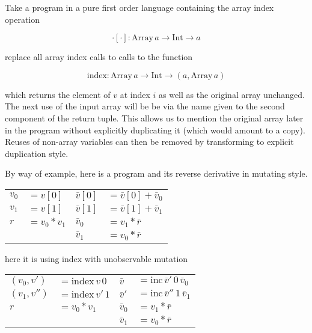 \documentclass[12pt]{article}
\begin{document}
Take a program in a pure first order language containing the array
index operation

\[
\cdot[\cdot] : \mathrm{Array} \, a \to \mathrm{Int} \to a
\]

replace all array index calls to calls to the function

\newcommand{\indexL}{\mathrm{index}}

\[
\indexL : \mathrm{Array} \, a \to \mathrm{Int} \to (a, \mathrm{Array}
\, a)
\]

which returns the element of $v$ at index $i$ as well as the original
array unchanged.  The next use of the input array will be be via the
name given to the second component of the return tuple.  This allows
us to mention the original array later in the program without
explicitly duplicating it (which would amount to a copy).  Reuses of
non-array variables can then be removed by transforming to explicit
duplication style.

By way of example, here is a program and its reverse derivative in
mutating style.

\begin{tabular}[t]{ll|ll}
  $v_0$ & $= v[0]$
  &
  $\bar{v}[0]$ & $ = \bar{v}[0] + \bar{v}_0$
  \\
  
  $v_1$ & $ = v[1]$
  &
  $\bar{v}[1]$ & $ = \bar{v}[1] + \bar{v}_1$
  \\

  $r$ & $= v_0 * v_1$
  &
  $\bar{v}_0$ & $ = v_1 * \bar{r}$
  \\

  & &
  $\bar{v}_1$ & $ = v_0 * \bar{r}$
  \\
\end{tabular}

here it is using $\indexL$ with unobservable mutation

\begin{tabular}[t]{ll|ll}
  $(v_0, v')$ & $ = \indexL \, v \, 0$
  &
  $\bar{v}$ & $ = \mathrm{inc} \, \bar{v}' \, 0 \, \bar{v}_0$
  \\
  
  $(v_1, v'')$ & $ = \indexL \, v' \, 1$
  &
  $\bar{v}'$ & $ = \mathrm{inc} \, \bar{v}'' \, 1 \, \bar{v}_1$
  \\

  $r$ & $ = v_0 * v_1$
  &
  $\bar{v}_0$ & $ = v_1 * \bar{r}$
  \\

  & &
  $\bar{v}_1$ & $ = v_0 * \bar{r}$
  \\
\end{tabular}
\end{document}
